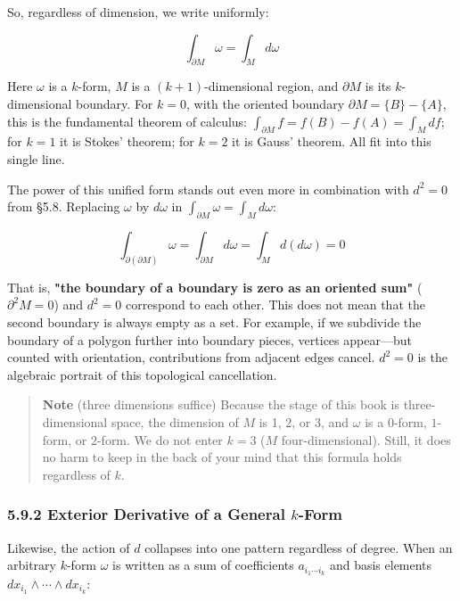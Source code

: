 \documentclass[a4paper,12pt,openany]{book}
\begin{document}
So, regardless of dimension, we write uniformly:

\[\int_{\partial M} \omega = \int_M d\omega\]

Here \(\omega\) is a \(k\)-form, \(M\) is a \((k+1)\)-dimensional
region, and \(\partial M\) is its \(k\)-dimensional boundary. For
\(k=0\), with the oriented boundary \(\partial M=\{B\}-\{A\}\), this is
the fundamental theorem of calculus:
\(\int_{\partial M} f=f(B)-f(A)=\int_M df\); for \(k=1\) it is Stokes'
theorem; for \(k=2\) it is Gauss' theorem. All fit into this single
line.

The power of this unified form stands out even more in combination with
\(d^2=0\) from §5.8. Replacing \(\omega\) by \(d\omega\) in
\(\int_{\partial M} \omega = \int_M d\omega\):

\[\int_{\partial(\partial M)} \omega = \int_{\partial M} d\omega = \int_M d(d\omega) = 0\]

That is,
\textbf{"the boundary of a boundary is zero as an oriented sum"}
(\(\partial^2 M = 0\)) and \textbf{$d^2=0$} correspond to each other.
This does not mean that the second boundary is always empty as a set.
For example, if we subdivide the boundary of a polygon further into
boundary pieces, vertices appear—but counted with orientation,
contributions from adjacent edges cancel. \(d^2=0\) is the algebraic
portrait of this topological cancellation.

\begin{quote}
\textbf{Note} (three dimensions suffice) Because the stage of this book
is three-dimensional space, the dimension of \(M\) is 1, 2, or 3, and
\(\omega\) is a \(0\)-form, \(1\)-form, or \(2\)-form. We do not enter
\(k=3\) (\(M\) four-dimensional). Still, it does no harm to keep in the
back of your mind that this formula holds regardless of \(k\).
\end{quote}

\hypertarget{exterior-derivative-of-a-general-k-form}{%
\subsubsection{\texorpdfstring{5.9.2 Exterior Derivative of a General
\(k\)-Form}{5.9.2 Exterior Derivative of a General k-Form}}\label{exterior-derivative-of-a-general-k-form}}

Likewise, the action of \(d\) collapses into one pattern regardless of
degree. When an arbitrary \(k\)-form \(\omega\) is written as a sum of
coefficients \(a_{i_1\cdots i_k}\) and basis elements
\(dx_{i_1}\wedge\cdots\wedge dx_{i_k}\):
\end{document}
